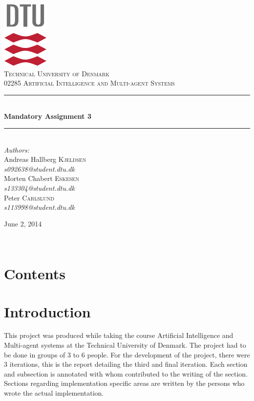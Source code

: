 \documentclass[11pt]{article}
\makeatletter
\renewcommand\tableofcontents{%
    \@starttoc{toc}%
}
\newcommand{\HRule}{\rule{\linewidth}{0.5mm}}
\makeatother
\begin{document}
\begin{titlepage}
\begin{center}

\includegraphics[scale=2.0]{../GFX/dtu_logo.pdf}\\[1cm]

\textsc{\LARGE Technical University of Denmark}\\[1.5cm]

\textsc{\Large 02285 Artificial Intelligence and Multi-agent Systems}\\[0.5cm]

\HRule \\[0.4cm]
{\huge \bfseries Mandatory Assignment 3}\\[0.1cm]
\HRule \\[1.5cm]

\large
\emph{Authors:}
\\[10pt]
Andreas Hallberg \textsc{Kjeldsen}\\
\emph{s092638@student.dtu.dk}
\\[10pt]
Morten Chabert \textsc{Eskesen}\\
\emph{s133304@student.dtu.dk}
\\[10pt]
Peter \textsc{Carlslund}\\
\emph{s113998@student.dtu.dk}

\vfill

{\large June 2, 2014}

\end{center}
\end{titlepage}

${}$
\vspace{-.55cm}

\section*{Contents}
\tableofcontents

\section{Introduction}
This project was produced while taking the course Artificial Intelligence and Multi-agent systems at the Technical University of Denmark. The project had to be done in groups of 3 to 6 people. For the development of the project, there were 3 iterations, this is the report detailing the third and final iteration. Each section and subsection is annotated with whom contributed to the writing of the section. Sections regarding implementation specific areas are written by the persons who wrote the actual implementation.
\end{document}

